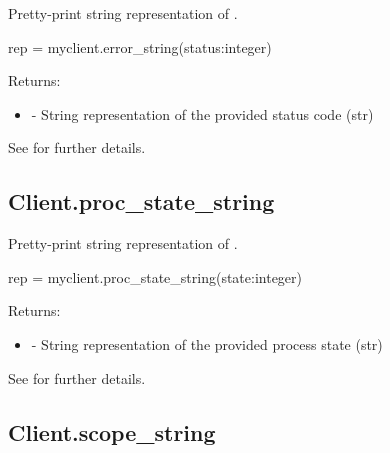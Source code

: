 \summary

Pretty-print string representation of .

\format

\pyspecificstart
\begin{codepar}
rep = myclient.error_string(status:integer)
\end{codepar}
\pyspecificend

\begin{arglist}
\end{arglist}

Returns:
\begin{itemize}
    \item {} - String representation of the provided status code (str)
\end{itemize}

See  for further details.


\subsection{Client.proc_state_string}

\summary

Pretty-print string representation of .

\format

\pyspecificstart
\begin{codepar}
rep = myclient.proc_state_string(state:integer)
\end{codepar}
\pyspecificend

\begin{arglist}
\end{arglist}

Returns:
\begin{itemize}
    \item {} - String representation of the provided process state (str)
\end{itemize}

See  for further details.


\subsection{Client.scope_string}

